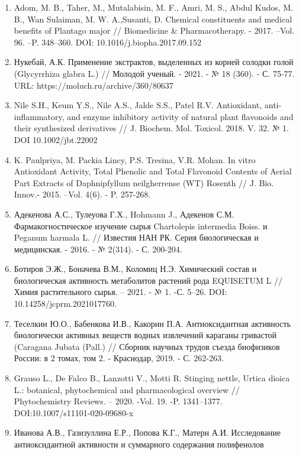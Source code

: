 \begin{enumerate}
\def\labelenumi{\arabic{enumi}.}
\item
  Adom, M. B., Taher, M., Mutalabisin, M. F., Amri, M. S., Abdul Kudos,
  M. B., Wan Sulaiman, M. W. A.,Susanti, D. Chemical constituents and
  medical benefits of Plantago major // Biomedicine \& Pharmacotherapy.
  - 2017. --Vol. 96. --P. 348--360. DOI: 10.1016/j.biopha.2017.09.152
\item
  Нукебай, А.К. Применение экстрактов, выделенных из корней солодки
  голой (Glycyrrhiza glabra L.) // Молодой ученый. - 2021. - № 18 (360).
  - С. 75-77. URL: https://moluch.ru/archive/360/80637
\item
  Nile S.H., Keum Y.S., Nile A.S., Jalde S.S., Patel R.V. Antioxidant,
  anti-inflammatory, and enzyme inhibitory activity of natural plant
  flavonoids and their synthesized derivatives // J. Biochem. Mol.
  Toxicol. 2018. V. 32. № 1. DOI 10.1002/jbt.22002
\item
  K. Paulpriya, M. Packia Lincy, P.S. Tresina, V.R. Mohan. In vitro
  Antioxidant Activity, Total Phenolic and Total Flavonoid Contents of
  Aerial Part Extracts of Daphnipfyllum neilgherrense (WT) Rosenth // J.
  Bio. Innov.- 2015. --Vol. 4(6). - P. 257-268.
\item
  Адекенова А.С., Тулеуова Г.Х., Hohmann J., Адекенов С.М.
  Фармакогностическое изучение сырья Chartolepis intermedia Boiss. и
  Peganum harmala L. // Известия НАН РК. Серия биологическая и
  медицинская. - 2016. - № 2(314). - С. 200-204.
\item
  Ботиров Э.Ж., Боначева В.М., Коломиц Н.Э. Химический состав и
  биологическая активность метаболитов растений рода EQUISETUM L //
  Химия растительного сырья. -- 2021. - № 1. -С. 5--26. DOI:
  10.14258/jcprm.2021017760.
\item
  Теселкин Ю.О., Бабенкова И.В., Какорин П.А. Антиоксидантная активность
  биологически активных веществ водных извлечений караганы гривастой
  (Caragana Jubata (Pall.) // Сборник научных трудов съезда биофизиков
  России: в 2 томах, том 2. - Краснодар, 2019. - С. 262-263.
\item
  Grauso L., De Falco B., Lanzotti V., Motti R. Stinging nettle, Urtica
  dioica L.: botanical, phytochemical and pharmacological overview //
  Phytochemistry Reviews. -- 2020. -Vol. 19. -P. 1341--1377.
  DOI:10.1007/s11101-020-09680-x
\item
  Иванова А.В., Газизуллина Е.Р., Попова К.Г., Матерн А.И. Исследование
  антиоксидантной активности и суммарного содержания полифенолов

\end{enumerate}
